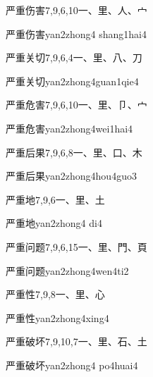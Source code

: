 \begin{entry}{严重伤害}{7,9,6,10}{⼀、⾥、⼈、⼧}
  \begin{phonetics}{严重伤害}{yan2zhong4 shang1hai4}
  \end{phonetics}
\end{entry}

\begin{entry}{严重关切}{7,9,6,4}{⼀、⾥、⼋、⼑}
  \begin{phonetics}{严重关切}{yan2zhong4guan1qie4}
  \end{phonetics}
\end{entry}

\begin{entry}{严重危害}{7,9,6,10}{⼀、⾥、⼙、⼧}
  \begin{phonetics}{严重危害}{yan2zhong4wei1hai4}
  \end{phonetics}
\end{entry}

\begin{entry}{严重后果}{7,9,6,8}{⼀、⾥、⼝、⽊}
  \begin{phonetics}{严重后果}{yan2zhong4hou4guo3}
  \end{phonetics}
\end{entry}

\begin{entry}{严重地}{7,9,6}{⼀、⾥、⼟}
  \begin{phonetics}{严重地}{yan2zhong4 di4}
  \end{phonetics}
\end{entry}

\begin{entry}{严重问题}{7,9,6,15}{⼀、⾥、⾨、⾴}
  \begin{phonetics}{严重问题}{yan2zhong4wen4ti2}
  \end{phonetics}
\end{entry}

\begin{entry}{严重性}{7,9,8}{⼀、⾥、⼼}
  \begin{phonetics}{严重性}{yan2zhong4xing4}
  \end{phonetics}
\end{entry}

\begin{entry}{严重破坏}{7,9,10,7}{⼀、⾥、⽯、⼟}
  \begin{phonetics}{严重破坏}{yan2zhong4 po4huai4}
  \end{phonetics}
\end{entry}

